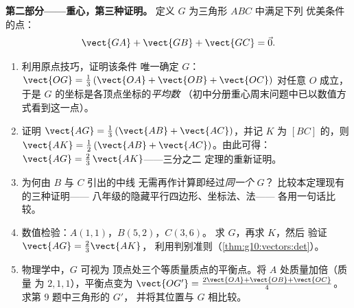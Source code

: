 \begin{problem}
\medskip
\noindent\textbf{第二部分——重心，第三种证明。}
定义 $G$ 为三角形 $ABC$ 中满足下列
优美条件的点：
\[
\vect{GA} + \vect{GB} + \vect{GC} = \vec 0 .
\]
\begin{enumerate}[resume]
  \item 利用原点技巧，证明该条件
        唯一确定 $G$：
        $\vect{OG} = \frac13\left(\vect{OA} + \vect{OB} +
        \vect{OC}\right)$ 对任意 $O$ 成立，于是
        $G$ 的坐标是各顶点坐标的\emph{平均数}
        （初中分册重心周末问题中已以数值方式看到这一点）。
  \item 证明 $\vect{AG} = \frac13\left(\vect{AB} +
        \vect{AC}\right)$，并记 $K$ 为
        $[BC]$ 的，则 $\vect{AK} = \frac12\left(\vect{AB} +
        \vect{AC}\right)$。由此可得：
        $\vect{AG} = \frac23\,\vect{AK}$——三分之二
        定理的重新证明。
  \item 为何由 $B$ 与 $C$ 引出的中线
        无需再作计算即经过\emph{同一个} $G$？
        比较本定理现有的三种证明——
        八年级的隐藏平行四边形、坐标法、法——
        各用一句话比较。
  \item 数值检验：$A(1, 1)$，$B(5, 2)$，$C(3, 6)$。
        求 $G$，再求 $K$，然后
        验证 $\vect{AG} = \frac23 \vect{AK}$，
        利用判别准则（\cref{thm:g10:vectors:det}）。
  \item 物理学中，$G$ 可视为
        顶点处三个等质量质点的平衡点。将 $A$ 处质量加倍（质量
        为 $2, 1, 1$），平衡点变为
        $\vect{OG'} = \frac{2\vect{OA} + \vect{OB} +
        \vect{OC}}{4}$。求第 9 题中三角形的 $G'$，
        并将其位置与 $G$ 相比较。
\end{enumerate}


\end{problem}
